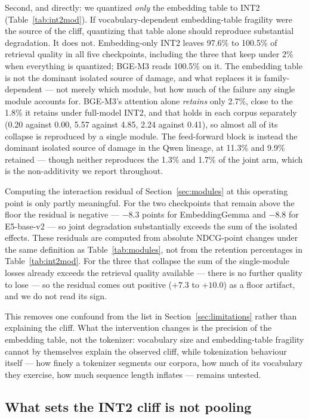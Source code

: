\documentclass[11pt]{article}
\begin{document}
Second, and directly: we quantized \emph{only} the embedding table to INT2
(Table~\ref{tab:int2mod}). If vocabulary-dependent embedding-table fragility were the source of
the cliff, quantizing that table alone should reproduce substantial degradation. It does not. Embedding-only INT2 leaves 97.6\% to 100.5\% of retrieval quality
in all five checkpoints, including the three that keep under 2\% when everything is
quantized; BGE-M3 reads 100.5\% on it. The embedding table is not the dominant isolated
source of damage, and what replaces it is family-dependent --- not merely which module, but how
much of the failure any single module accounts for. BGE-M3's
attention alone \emph{retains} only 2.7\%, close to the 1.8\% it retains under full-model
INT2, and that holds in each corpus separately (0.20 against 0.00, 5.57 against 4.85, 2.24
against 0.41), so almost all of its collapse is reproduced by a single module. The
feed-forward block is instead the dominant isolated source of damage in the Qwen lineage, at
11.3\% and 9.9\% retained --- though neither reproduces the 1.3\% and 1.7\% of the joint arm,
which is the non-additivity we report throughout.

Computing the interaction residual of Section~\ref{sec:modules} at this operating point is
only partly meaningful. For the two checkpoints that remain above the floor the residual is
negative --- $-8.3$ points for EmbeddingGemma and $-8.8$ for E5-base-v2 --- so joint
degradation substantially exceeds the sum of the isolated effects. These residuals are computed
from absolute NDCG-point changes under the same definition as Table~\ref{tab:modules}, not
from the retention percentages in Table~\ref{tab:int2mod}. For the three that collapse the sum of
the single-module losses already exceeds the retrieval quality available --- there is no
further quality to lose --- so the residual comes out positive ($+7.3$ to $+10.0$) as a floor
artifact, and we do not read its sign.

This removes one confound from the list in Section~\ref{sec:limitations} rather than
explaining the cliff. What the intervention changes is the precision of the embedding table,
not the tokenizer: vocabulary size and embedding-table fragility cannot by themselves explain the
observed cliff, while tokenization behaviour itself --- how finely a tokenizer segments our
corpora, how much of its vocabulary they exercise, how much sequence length inflates ---
remains untested.



\subsection{What sets the INT2 cliff is not pooling}
\label{sec:pooling}
\end{document}
